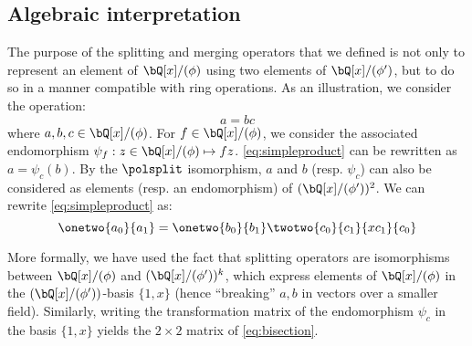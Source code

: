 \subsection{Algebraic interpretation}\label{sec:spec:splitmerge:algebraic}

  The purpose of the splitting and merging operators that we defined is not only to represent an element of $\bQ[x]/(\phi)$ using two elements of $\bQ[x]/(\phi')$, but to do so in a manner compatible with ring operations. As an illustration, we consider the operation:
 \begin{equation}\label{eq:simpleproduct}
 a = b c
 \end{equation}
where $a, b, c \in \bQ[x]/(\phi)$. For $f \in \bQ[x]/(\phi)$, we consider the associated endomorphism $\psi_f : z \in \bQ[x]/(\phi) \mapsto fz$. \eqref{eq:simpleproduct} can be rewritten as $a = \psi_c(b)$. By the $\polsplit$ isomorphism, $a$ and $b$ (resp. $\psi_c$) can also be considered as elements (resp. an endomorphism) of $(\bQ[x]/(\phi'))^2$. We can rewrite \eqref{eq:simpleproduct} as:
   \begin{equation}\label{eq:bisection}
  \onetwo{a_0}{a_1} = \onetwo{b_0}{b_1}  \twotwo{c_{0}}{c_{1}}{x c_{1}}{c_{0}}
   \end{equation}

 More formally, we have used the fact that splitting operators are isomorphisms between $\bQ[x]/(\phi)$ and $(\bQ[x]/(\phi'))^k$, which express elements of $\bQ[x]/(\phi)$ in the $(\bQ[x]/(\phi'))$-basis $\{1,x\}$ (hence ``breaking'' $a,b$ in vectors over a smaller field). Similarly, writing the transformation matrix of the endomorphism $\psi_c$ in the basis $\{1,x\}$ yields the $2\times 2$ matrix of \eqref{eq:bisection}.

%


